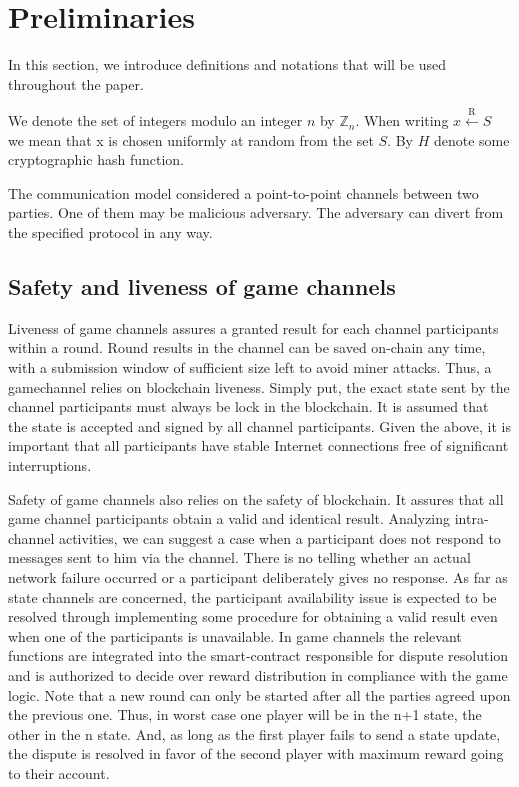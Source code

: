\section{Preliminaries}
In this section, we introduce definitions and notations that will be used throughout the paper.

We denote the set of integers modulo an integer $n$ by $\mathbb{Z}_n$. When writing $x \xleftarrow{\text{R}} S$ we mean that x is chosen uniformly at random from the set $S$. By $H$ denote some cryptographic hash function. 

The communication model considered a point-to-point channels between two parties. One of them may be malicious adversary. The adversary can divert from the specified protocol in any way. 

	\subsection{Safety and liveness of game channels}

Liveness of game channels assures a granted result for each channel participants within a round. Round results in the channel can be saved on-chain any time,  with a submission window of sufficient size left to avoid miner attacks. Thus, a gamechannel relies on blockchain liveness. Simply put,  the exact state sent by the channel participants must always be lock in the blockchain. It is assumed that the state is accepted and signed by all channel participants. Given the above, it is important that all participants have stable Internet connections free of significant interruptions. 

Safety of game channels also relies on the safety of blockchain. It assures that all game channel participants obtain a valid and identical result. Analyzing intra-channel activities, we can suggest a case when a participant does not respond to messages sent to him via the channel. There is no telling whether an actual network failure occurred or a participant deliberately gives no response. As far as state channels are concerned, the participant availability issue is expected to be resolved through implementing some procedure for obtaining a valid result even when one of the participants is unavailable. In game channels the relevant functions are integrated into the smart-contract responsible for dispute resolution and is authorized to decide over reward distribution in compliance with the game logic. Note that a new round can only be started after all the parties agreed upon the previous one. Thus, in worst case one player will be in the n+1 state, the other in the n state. And, as long as the first player fails to send a state update, the dispute is resolved in favor of the second player with maximum reward going to their account.

